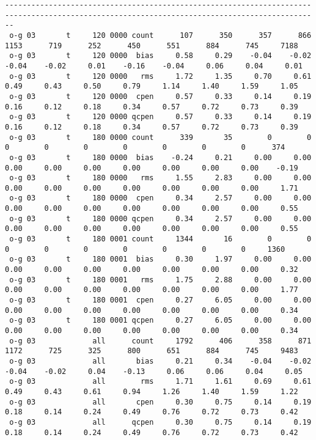 \begin{itemize}[leftmargin=*]
\begin{tiny}
\begin{verbatim}
----------------------------------------------------------------------------------------------------------------------------------------------
 o-g 03       t     120 0000 count      107      350      357      866     1153      719      252      450      551      884      745     7188
 o-g 03       t     120 0000  bias     0.58     0.29    -0.04    -0.02    -0.04    -0.02     0.01    -0.16    -0.04     0.06     0.04     0.01
 o-g 03       t     120 0000   rms     1.72     1.35     0.70     0.61     0.49     0.43     0.50     0.79     1.14     1.40     1.59     1.05
 o-g 03       t     120 0000  cpen     0.57     0.33     0.14     0.19     0.16     0.12     0.18     0.34     0.57     0.72     0.73     0.39
 o-g 03       t     120 0000 qcpen     0.57     0.33     0.14     0.19     0.16     0.12     0.18     0.34     0.57     0.72     0.73     0.39
 o-g 03       t     180 0000 count      339       35        0        0        0        0        0        0        0        0        0      374
 o-g 03       t     180 0000  bias    -0.24     0.21     0.00     0.00     0.00     0.00     0.00     0.00     0.00     0.00     0.00    -0.19
 o-g 03       t     180 0000   rms     1.55     2.83     0.00     0.00     0.00     0.00     0.00     0.00     0.00     0.00     0.00     1.71
 o-g 03       t     180 0000  cpen     0.34     2.57     0.00     0.00     0.00     0.00     0.00     0.00     0.00     0.00     0.00     0.55
 o-g 03       t     180 0000 qcpen     0.34     2.57     0.00     0.00     0.00     0.00     0.00     0.00     0.00     0.00     0.00     0.55
 o-g 03       t     180 0001 count     1344       16        0        0        0        0        0        0        0        0        0     1360
 o-g 03       t     180 0001  bias     0.30     1.97     0.00     0.00     0.00     0.00     0.00     0.00     0.00     0.00     0.00     0.32
 o-g 03       t     180 0001   rms     1.75     2.88     0.00     0.00     0.00     0.00     0.00     0.00     0.00     0.00     0.00     1.77
 o-g 03       t     180 0001  cpen     0.27     6.05     0.00     0.00     0.00     0.00     0.00     0.00     0.00     0.00     0.00     0.34
 o-g 03       t     180 0001 qcpen     0.27     6.05     0.00     0.00     0.00     0.00     0.00     0.00     0.00     0.00     0.00     0.34
 o-g 03             all      count     1792      406      358      871     1172      725      325      800      651      884      745     9483
 o-g 03             all       bias     0.21     0.34    -0.04    -0.02    -0.04    -0.02     0.04    -0.13     0.06     0.06     0.04     0.05
 o-g 03             all        rms     1.71     1.61     0.69     0.61     0.49     0.43     0.61     0.94     1.26     1.40     1.59     1.22
 o-g 03             all       cpen     0.30     0.75     0.14     0.19     0.18     0.14     0.24     0.49     0.76     0.72     0.73     0.42
 o-g 03             all      qcpen     0.30     0.75     0.14     0.19     0.18     0.14     0.24     0.49     0.76     0.72     0.73     0.42
\end{verbatim}
\end{tiny}


\end{itemize}

